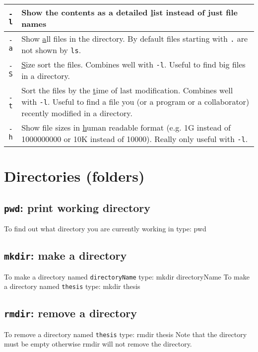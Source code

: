 \documentclass[12pt]{article}
\newenvironment{cmd}{\verbatim}{\endverbatim\vspace{5pt}}
\begin{document}
{\def\arraystretch{1.7}
\begin{tabular}{|c|m{5.5in}|}
\hline
\large \texttt{-l} & Show the contents as a detailed \underline{l}ist instead of just file names\\
\hline
\large \texttt{-a} & Show \underline{a}ll files in the directory. By default files starting with \texttt{.} are not shown by \texttt{ls}.\\
\hline
\large \texttt{-S} & \underline{S}ize sort the files. Combines well with \texttt{-l}. Useful to find big files in a directory.\\
\hline
\large \texttt{-t} & Sort the files by the \underline{t}ime of last modification. Combines well with \texttt{-l}. Useful to find a file you (or a program or  a collaborator) recently modified in a directory.\\
\hline
\large \texttt{-h} & Show file sizes in \underline{h}uman readable format (e.g. 1G instead of 1000000000 or 10K instead of 10000). Really only useful with \texttt{-l}.\\
\hline
\end{tabular}
}




\section*{Directories (folders)}

\subsection*{\texttt{pwd}: print working directory}
To find out what directory you are currently working in type:
\begin{cmd}
  pwd
\end{cmd}

\subsection*{\texttt{mkdir}: make a directory}
To make a directory named \texttt{directoryName} type:
\begin{cmd}
  mkdir directoryName
\end{cmd}
To make a directory named \texttt{thesis} type:
\begin{cmd}
  mkdir thesis
\end{cmd}

\subsection*{\texttt{rmdir}: remove a directory}
To remove a directory named \texttt{thesis} type:
\begin{cmd}
  rmdir thesis
\end{cmd}
Note that the directory must be empty otherwise rmdir will not remove the directory.
\end{document}
